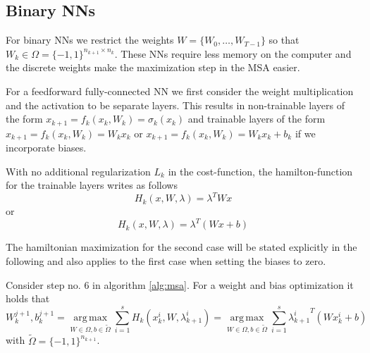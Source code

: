 \documentclass[a4paper, 12pt]{scrreprt} %
\DeclareMathOperator*{\argmax}{arg\,max}
\begin{document}
\subsection{Binary \aclp{NN}}
\label{subsec:bnn}

For binary \acp{NN} we restrict the weights $W=\{W_0,\dots,W_{T-1}\}$ so that $W_k \in \Omega = \{-1,1\}^{n_{k+1}\times n_{k}}$. These \acp{NN} require less memory on the computer and the discrete weights make the maximization step in the \ac{MSA} easier.\newline

For a feedforward fully-connected \ac{NN} we first consider the weight multiplication and the activation to be separate layers. This results in non-trainable layers of the form $x_{k+1} = f_k(x_k,W_k) = \sigma_k(x_k)$ and trainable layers of the form $x_{k+1} = f_k(x_k,W_k) = W_k x_k$ or $x_{k+1} = f_k(x_k,W_k) = W_k x_k + b_k$ if we incorporate biases.

With no additional regularization $L_k$ in the cost-function, the hamilton-function for the trainable layers writes as follows
\begin{equation}
H_k(x,W,\lambda) = \lambda^T W x 
\end{equation}
or
\begin{equation}
H_k(x,W,\lambda) = \lambda^T (W x+b) 
\end{equation}

The hamiltonian maximization for the second case will be stated explicitly in the following and also applies to the first case when setting the biases to zero.

Consider step no. 6 in algorithm \ref{alg:msa}. For a weight and bias optimization it holds that
\begin{equation*}
W_k^{j+1}, b_k^{j+1} = \underset{W\in \Omega, b \in \tilde\Omega}{\argmax} \sum_{i=1}^s{H_k(x_k^{i},W,\lambda_{k+1}^{i})} = \underset{W\in \Omega, b \in \tilde\Omega}{\argmax} \sum_{i=1}^s{{\lambda_{k+1}^{i}}^T (W x_k^{i} + b)}
\end{equation*}
with $\tilde{\Omega} = \{-1,1\}^{n_{k+1}}$.
\end{document}
